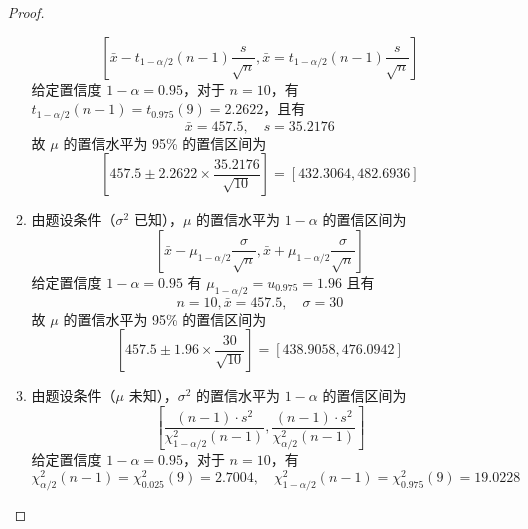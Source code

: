 \documentclass[normal,cn]{elegantnote}
\begin{document}
\begin{enumerate}
\begin{proof}
\begin{enumerate}
\begin{equation*}
                          \left[\bar{x}-t_{1-\alpha/2}(n-1)\frac{s}{\sqrt{n}},\bar{x}=t_{1-\alpha/2}(n-1)\frac{s}{\sqrt{n}}\right]
                      \end{equation*}
                      给定置信度 $1-\alpha=0.95$，对于 $n=10$，有 $t_{1-\alpha/2}(n-1)=t_{0.975}(9)=2.2622$，且有
                      \begin{equation*}
                          \bar{x}=457.5,\quad s=35.2176
                      \end{equation*}
                      故 $\mu$ 的置信水平为 95\% 的置信区间为
                      \begin{equation*}
                          \left[457.5\pm 2.2622\times\frac{35.2176}{\sqrt{10}}\right]=[432.3064,482.6936]
                      \end{equation*}
                \item 由题设条件（$\sigma^{2}$ 已知），$\mu$ 的置信水平为 $1-\alpha$ 的置信区间为
                      \begin{equation*}
                          \left[\bar{x}-\mu_{1-\alpha/2}\frac{\sigma}{\sqrt{n}},\bar{x}+\mu_{1-\alpha/2}\frac{\sigma}{\sqrt{n}}\right]
                      \end{equation*}
                      给定置信度 $1-\alpha=0.95$ 有 $\mu_{1-\alpha/2}=u_{0.975}=1.96$  且有
                      \begin{equation*}
                          n=10,\bar{x}=457.5, \quad \sigma=30
                      \end{equation*}
                      故 $\mu$ 的置信水平为 95\% 的置信区间为
                      \begin{equation*}
                          \left[457.5 \pm 1.96\times\frac{30}{\sqrt{10}}\right]=[438.9058,476.0942]
                      \end{equation*}
                \item 由题设条件（$\mu$ 未知），$\sigma^{2}$ 的置信水平为 $1-\alpha$ 的置信区间为
                      \begin{equation*}
                          \left[\frac{(n-1)\cdot s^{2}}{\chi_{1-\alpha/2}^{2}(n-1)},\frac{(n-1)\cdot s^{2}}{\chi_{\alpha/2}^{2}(n-1)}\right]
                      \end{equation*}
                      给定置信度 $1-\alpha=0.95$，对于 $n=10$，有
                      \begin{equation*}
                          \chi_{\alpha/2}^{2}(n-1)=\chi_{0.025}^{2}(9)=2.7004, \quad\chi_{1-\alpha/2}^{2}(n-1)=\chi_{0.975}^{2}(9)=19.0228

\end{equation*}
\end{enumerate}
\end{proof}
\end{enumerate}
\end{document}
